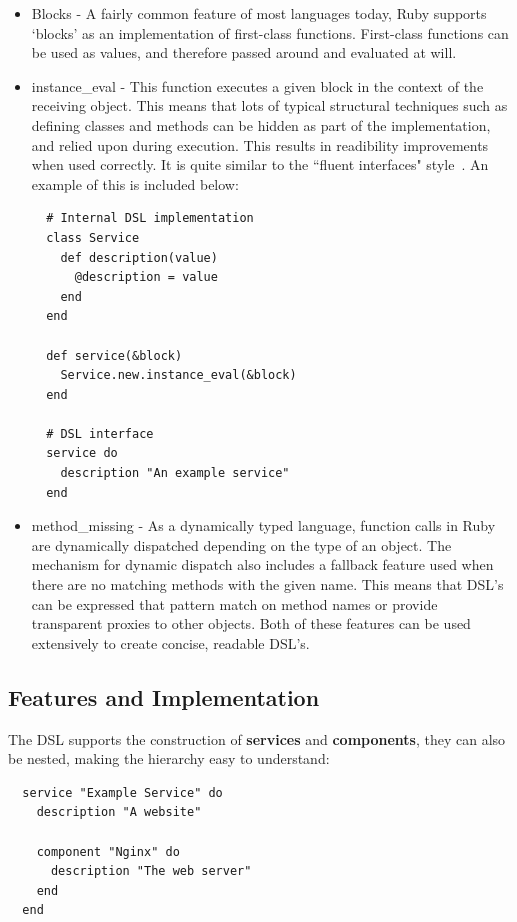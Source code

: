 \documentclass{cshonours}
\begin{document}
\begin{itemize}
  \item{Blocks} - A fairly common feature of most languages today, Ruby supports `blocks' as an implementation of first-class functions. First-class functions can be used as values, and therefore passed around and evaluated at will.

  \item{instance\_eval} - This function executes a given block in the context of the receiving object. This means that lots of typical structural techniques such as defining classes and methods can be hidden as part of the implementation, and relied upon during execution. This results in readibility improvements when used correctly. It is quite similar to the ``fluent interfaces" style~\cite{FluentInterfaces}. An example of this is included below:

  \begin{verbatim}
  # Internal DSL implementation
  class Service
    def description(value)
      @description = value
    end
  end

  def service(&block)
    Service.new.instance_eval(&block)
  end

  # DSL interface
  service do
    description "An example service"
  end
  \end{verbatim}
  \label{fig:MetaProgrammingSnippet}

  \item{method\_missing} - As a dynamically typed language, function calls in Ruby are dynamically dispatched depending on the type of an object. The mechanism for dynamic dispatch also includes a fallback feature used when there are no matching methods with the given name. This means that DSL's can be expressed that pattern match on method names or provide transparent proxies to other objects. Both of these features can be used extensively to create concise, readable DSL's.
\end{itemize}

\subsection{Features and Implementation}

The DSL supports the construction of \textbf{services} and \textbf{components}, they can also be nested, making the hierarchy easy to understand:

\begin{verbatim}
  service "Example Service" do
    description "A website"

    component "Nginx" do
      description "The web server"
    end
  end
\end{verbatim}
\label{fig:MetaProgrammingSnippet}
\end{document}
